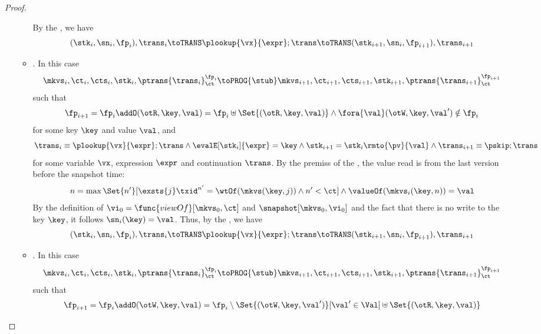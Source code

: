 \begin{proof}
\begin{itemize}
\begin{itemize}
                By the , we have 
                \[
                    (\stk_i, \sn_i, \fp_i), \trans_i \toTRANS \plookup{\vx}{\expr} ; \trans 
                    \toTRANS (\stk_{i+1}, \sn_i, \fp_{i+1} ), \trans_{i+1}
                \]
            \item {}.
                In this case
                \[
                    \mkvs_i, \ct_i, \cts_i, \stk_i, \ptrans{\trans_i}_\ct^{\fp_i}
                    \toPROG{\stub}
                    \mkvs_{i+1}, \ct_{i+1}, \cts_{i+1}, \stk_{i+1}, \ptrans{\trans_{i+1}}_\ct^{\fp_{i+1}}
                \]
                such that
                \[
                    \fp_{i+1} = \fp_i \addO (\otR, \key, \val) = \fp_i \uplus \Set{(\otR, \key, \val)}
                    \land \fora{\val} (\otW,\key, \val') \notin \fp_i
                \]
                for some key \( \key \) and value \( \val \), and
                \[
                    \trans_{i} \equiv \plookup{\vx}{\expr} ; \trans 
                    \land \evalE[\stk_i]{\expr} = \key 
                    \land \stk_{i+1} = \stk_i\rmto{\pv}{\val}
                    \land  \trans_{i+1} \equiv \pskip ; \trans
                \]
                for some variable \( \vx \), expression \( \expr \) and continuation \( \trans \).
                By the premiss of the , the value read is from the last version before the snapshot time:
                \[
                    n = \max\Set{n'}[%
                        \exsts{j} \txid^{n'} = \wtOf(\mkvs(\key, j)) \land n' < \ct%
                    ]
                    \land \valueOf(\mkvs_i(\key,n) ) = \val
                \]                 
                By the definition of \( \vi_0 = \func{viewOf}[\mkvs_0,\ct] \) and \( \snapshot[\mkvs_0,\vi_0] \) and the fact that there is no write to the key \( \key \),
                it follows \( \sn_i(\key) = \val \).
                Thus, by the , we have 
                \[
                    (\stk_i, \sn_i, \fp_i), \trans_i \toTRANS \plookup{\vx}{\expr} ; \trans 
                    \toTRANS (\stk_{i+1}, \sn_i, \fp_{i+1} ), \trans_{i+1}
                \]
            \item {}.
                In this case
                \[
                    \mkvs_i, \ct_i, \cts_i, \stk_i, \ptrans{\trans_i}_\ct^{\fp_i}
                    \toPROG{\stub}
                    \mkvs_{i+1}, \ct_{i+1}, \cts_{i+1}, \stk_{i+1}, \ptrans{\trans_{i+1}}_\ct^{\fp_{i+1}}
                \]
                such that
                \[
                    \fp_{i+1} = \fp_i \addO (\otW, \key, \val) = \fp_i \setminus \Set{(\otW, \key, \val')}[\val' \in \Val] \uplus \Set{(\otR, \key, \val)}
\]
\end{itemize}
\end{itemize}
\end{proof}
